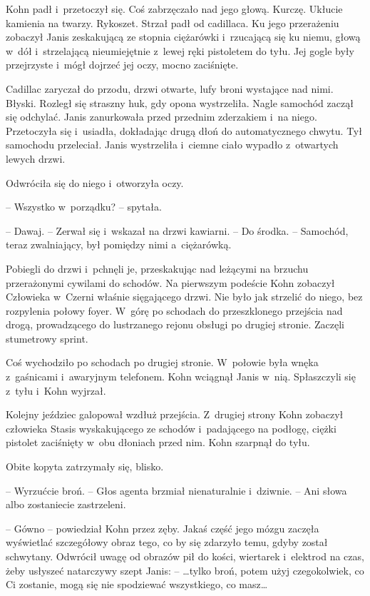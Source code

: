 \documentclass[oneside,polish,11pt,sfheadings]{mwbk}
\begin{document}
Kohn padł i~przetoczył się. Coś zabrzęczało nad jego głową. Kurczę.
Ukłucie kamienia na twarzy. Rykoszet. Strzał padł od cadillaca. Ku jego
przerażeniu zobaczył Janis zeskakującą ze stopnia ciężarówki i~rzucającą
się ku niemu, głową w~dół i~strzelającą nieumiejętnie z~lewej ręki
pistoletem do tyłu. Jej gogle były przejrzyste i~mógł dojrzeć jej oczy,
mocno zaciśnięte.

Cadillac zaryczał do przodu, drzwi otwarte, lufy broni wystające nad
nimi. Błyski. Rozległ się straszny huk, gdy opona wystrzeliła. Nagle
samochód zaczął się odchylać. Janis zanurkowała przed przednim
zderzakiem i~na niego. Przetoczyła się i~usiadła, dokładając drugą dłoń
do automatycznego chwytu. Tył samochodu przeleciał. Janis wystrzeliła i~ciemne ciało wypadło z~otwartych lewych drzwi.

Odwróciła się do niego i~otworzyła oczy.

-- Wszystko w~porządku? -- spytała.

-- Dawaj. -- Zerwał się i~wskazał na drzwi kawiarni. -- Do środka. -- Samochód, teraz zwalniający, był pomiędzy nimi a~ciężarówką.

Pobiegli do drzwi i~pchnęli je, przeskakując nad leżącymi na brzuchu
przerażonymi cywilami do schodów. Na pierwszym podeście Kohn zobaczył
Człowieka w~Czerni właśnie sięgającego drzwi. Nie było jak strzelić do
niego, bez rozpylenia połowy foyer. W~górę po schodach do przeszklonego
przejścia nad drogą, prowadzącego do lustrzanego rejonu obsługi po
drugiej stronie. Zaczęli stumetrowy sprint.

Coś wychodziło po schodach po drugiej stronie. W~połowie była wnęka z~gaśnicami i~awaryjnym telefonem. Kohn wciągnął Janis w~nią. Spłaszczyli
się z~tyłu i~Kohn wyjrzał.

Kolejny jeździec galopował wzdłuż przejścia. Z~drugiej strony Kohn
zobaczył człowieka Stasis wyskakującego ze schodów i~padającego na
podłogę, ciężki pistolet zaciśnięty w~obu dłoniach przed nim. Kohn
szarpnął do tyłu.

Obite kopyta zatrzymały się, blisko.

-- Wyrzućcie broń. -- Głos agenta brzmiał nienaturalnie i~dziwnie. -- Ani
słowa albo zostaniecie zastrzeleni.

-- Gówno -- powiedział Kohn przez zęby. Jakaś część jego mózgu zaczęła
wyświetlać szczegółowy obraz tego, co by się zdarzyło temu, gdyby został
schwytany. Odwrócił uwagę od obrazów pił do kości, wiertarek i~elektrod
na czas, żeby usłyszeć natarczywy szept Janis: -- \ldots tylko broń, potem
użyj czegokolwiek, co Ci zostanie, mogą się nie spodziewać wszystkiego,
co masz\ldots
\end{document}

